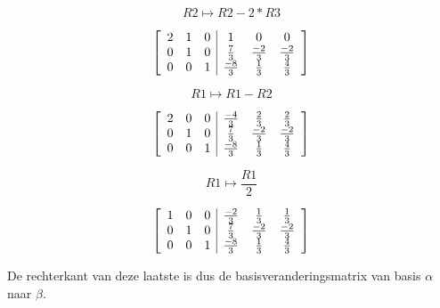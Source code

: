 \documentclass[lineaire_algebra_oplossingen.tex]{subfiles}
\begin{document}
\[R2 \mapsto R2 - 2*R3 \]

\[
\left[
\begin{array}{ c c c | c c c }
2 & 1 & 0 & 1 & 0 & 0\\
0 & 1 & 0 & \frac{7}{3} & \frac{-2}{3} & \frac{-2}{3}\\
0 & 0 & 1 & \frac{-8}{3} & \frac{1}{3} & \frac{4}{3}
\end{array}
\right]
\]

\[R1 \mapsto R1 - R2 \]

\[
\left[
\begin{array}{ c c c | c c c }
2 & 0 & 0 & \frac{-4}{3} & \frac{2}{3} & \frac{2}{3}\\
0 & 1 & 0 & \frac{7}{3} & \frac{-2}{3} & \frac{-2}{3}\\
0 & 0 & 1 & \frac{-8}{3} & \frac{1}{3} & \frac{4}{3}
\end{array}
\right]
\]

\[R1 \mapsto \frac{R1}{2}\]

\[
\left[
\begin{array}{ c c c | c c c }
1 & 0 & 0 & \frac{-2}{3} & \frac{1}{3} & \frac{1}{3}\\
0 & 1 & 0 & \frac{7}{3} & \frac{-2}{3} & \frac{-2}{3}\\
0 & 0 & 1 & \frac{-8}{3} & \frac{1}{3} & \frac{4}{3}
\end{array}
\right]
\]

De rechterkant van deze laatste is dus de basisveranderingsmatrix van basis $\alpha$ naar $\beta$.
\end{document}
